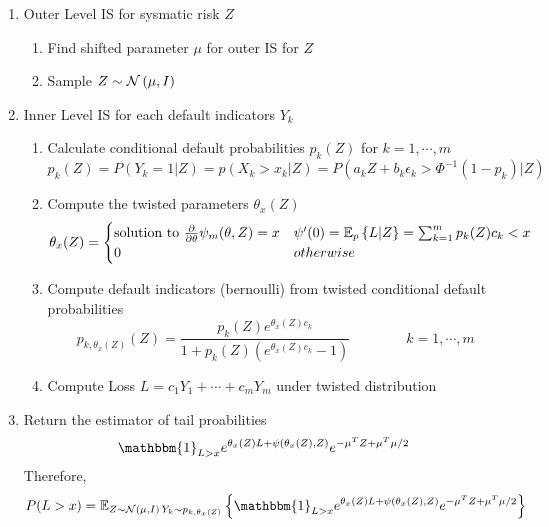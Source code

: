 \documentclass[11pt]{article}
\begin{document}
\begin{enumerate}
    \item Outer Level IS for sysmatic risk $Z$ 
    \begin{enumerate}
        \item Find shifted parameter $\mu$ for outer IS for $Z$
        \item Sample $Z \sim \normal{\mu, I}$ 
    \end{enumerate}
    \item Inner Level IS for each default indicators $Y_k$ 
    \begin{enumerate}
        \item Calculate conditional default probabilities $p_k(Z)$ for $k=1,\cdots, m$
        \[
            p_k(Z) = P(Y_k=1 | Z) = p(X_k > x_k | Z) = P(a_k Z + b_k \epsilon_k > \Phi^{-1}(1-p_k) | Z)
        \]
        \item Compute the twisted parameters $\theta_x(Z)$ 
        \[
            \theta_x(Z) = 
            \begin{cases}
                \text{solution to } \frac{\partial}{\partial \theta}\psi_m(\theta, Z) = x & \psi'(0) = \E[p]{L|Z} = \sum_{k=1}^m p_k(Z) c_k < x \\ 
                0 & otherwise \\ 
            \end{cases}    
        \]
        \item Compute default indicators (bernoulli) from twisted conditional default probabilities
        \[
            p_{k,\theta_x(Z)} (Z) = \frac{p_k(Z) e^{\theta_x(Z)c_k}}{1 + p_k(Z)(e^{\theta_x(Z)c_k} - 1)}
            \qquad 
            \qquad 
            k = 1,\cdots, m
        \]
        \item Compute Loss $L = c_1 Y_1 + \cdots + c_m Y_m$ under twisted distribution
    \end{enumerate}
    \item Return the estimator of tail proabilities
    \[
        \mathbbm{1}_{L>x} e^{\theta_x(Z)L + \psi(\theta_x(Z), Z)} e^{ -\mu^T Z + \mu^T \mu /2 }
    \]
    Therefore,
    \[
        P(L > x) = \E[Z\sim \normal{\mu, I} \, Y_k \sim p_{k, \theta_x(Z)}]{
            \mathbbm{1}_{L>x} e^{\theta_x(Z)L + \psi(\theta_x(Z), Z)} e^{ -\mu^T Z + \mu^T \mu /2 }
        }
    \]
\end{enumerate}
\end{document}
